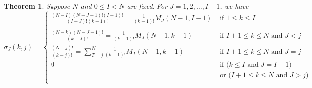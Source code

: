 \documentclass[11pt]{amsart}   %
\newtheorem{theorem}{Theorem}[section]
\theoremstyle{definition}
\theoremstyle{remark}
\numberwithin{equation}{section}
\theoremstyle{theorem}
\begin{document}
\begin{theorem}\label{t:main_mu}
Suppose $N$ and $0 \leq I < N$ are fixed.  For $J = 1, 2, \ldots, I+1$, we have
\[ \sigma_J(k, j) = \begin{cases}
        \frac{(N-I)(N-J-1)!(I-1)!}{(I-J)!(k-1)!} = \frac{1}{(k-1)!} M_J(N-1, I-1) & \text{ if $1 \leq k \leq I$ } \\
        \ & \ \\
        \frac{(N-k)(N-J-1)!}{(k-J)!} = \frac{1}{(k-1)!} M_J(N-1, k-1) & \text{ if $I+1 \leq k \leq N$ and $J < j$ } \\
        \frac{(N-j)!}{(k-j)!} = \sum_{T = j}^N \frac{1}{(k-1)!} M_{T}(N-1, k-1) & \text{ if $I+1 \leq k \leq N$ and $J = j$ } \\
        0 & \text{ if ($k \leq I$ and $J = I+1$)  } \\
         & \text{ \ \ or ($I+1 \leq k \leq N$ and $J > j$) } \\
\end{cases} \]
\end{theorem}
\end{document}
